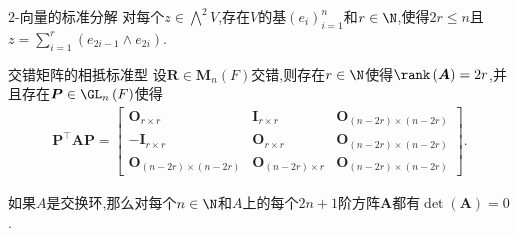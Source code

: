 \begin{corollary}{$2$-向量的标准分解}{}
	对每个$z\in\bigwedge\limits^{2}V$,存在$V$的基$\left(e_{i}\right)_{i=1}^{n}$和$r\in\N$,使得$2r\leq n$且$z=\sum\limits_{i=1}^{r}\left(e_{2i-1}\wedge e_{2i}\right)$.
\end{corollary}

\begin{corollary}{交错矩阵的相抵标准型}{}
	设$\boldsymbol{R}\in\mathbf{M}_{n}\left(F\right)$交错,则存在$r\in\N$使得$\rank\left(\boldsymbol{A}\right)=2r$,并且存在$\boldsymbol{P}\in\GL_{n}\left(F\right)$使得
	\begin{align*}
		\boldsymbol{P}^{\top}\boldsymbol{A}\boldsymbol{P}=\begin{bmatrix}
			\boldsymbol{O}_{r\times r}&\boldsymbol{I}_{r\times r}&\boldsymbol{O}_{\left(n-2r\right)\times\left(n-2r\right)}\\
			-\boldsymbol{I}_{r\times r}&\boldsymbol{O}_{r\times r}&\boldsymbol{O}_{\left(n-2r\right)\times\left(n-2r\right)}\\
			\boldsymbol{O}_{\left(n-2r\right)\times\left(n-2r\right)}&\boldsymbol{O}_{\left(n-2r\right)\times r}&\boldsymbol{O}_{\left(n-2r\right)\times\left(n-2r\right)}
		\end{bmatrix}.
	\end{align*}
\end{corollary}

\begin{remark}{}{}
	如果$A$是交换环,那么对每个$n\in\N$和$A$上的每个$2n+1$阶方阵$\boldsymbol{A}$都有$\det\left(\boldsymbol{A}\right)=0$.
\end{remark}
